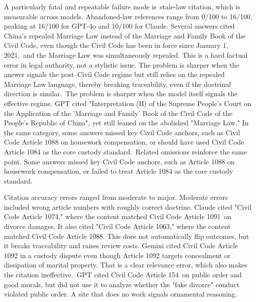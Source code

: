 \documentclass[pdflatex,sn-mathphys-ay]{sn-jnl}%
\theoremstyle{thmstyleone}%
\theoremstyle{thmstyletwo}%
\theoremstyle{thmstylethree}%
\begin{document}
A particularly fatal and repeatable failure mode is~stale-law citation, which is measurable across models. Abandoned-law references range from 0/100 to 16/100, peaking at 16/100 for GPT-4o and 10/100 for Claude. Several answers cited China's repealed Marriage Law instead of the Marriage and Family Book of the Civil Code, even though the Civil Code has been in force since January 1, 2021,~and the Marriage Law was simultaneously repealed. This is a hard factual error in legal authority, not a stylistic issue. The problem is sharper when the answer signals the post--Civil Code regime but still relies on the repealed Marriage Law language, thereby breaking traceability, even if the doctrinal direction is similar.~The problem is sharper when the model itself signals the effective regime. GPT cited "Interpretation (II) of the Supreme People's Court on the Application of the 'Marriage and Family' Book of the Civil Code of the People's Republic of China", yet still leaned on the abolished "Marriage Law." In the same category, some answers missed key Civil Code anchors, such as Civil Code Article 1088 on housework compensation, or should have used Civil Code Article 1084 as the core custody standard.~Related omissions reinforce the same point. Some answers missed key Civil Code anchors, such as Article 1088 on housework compensation, or failed to treat Article 1084 as the core custody standard.

Citation accuracy errors ranged from moderate to major. Moderate errors included wrong article numbers with roughly correct doctrine. Claude cited "Civil Code Article 1074," where the content matched Civil Code Article 1091~on divorce damages. It also cited "Civil Code Article 1063," where the content matched Civil Code Article 1088. This does not automatically flip outcomes, but it breaks traceability and raises review costs. Gemini cited Civil Code Article 1092 in a custody dispute even though Article 1092 targets concealment or dissipation of marital property. That is a clear relevance error, which also makes the citation ineffective.~GPT cited Civil Code Article 154~on public order and good morals, but did not use it to analyze whether the "fake divorce" conduct violated public order. A site that does no work signals ornamental reasoning.~
\end{document}
